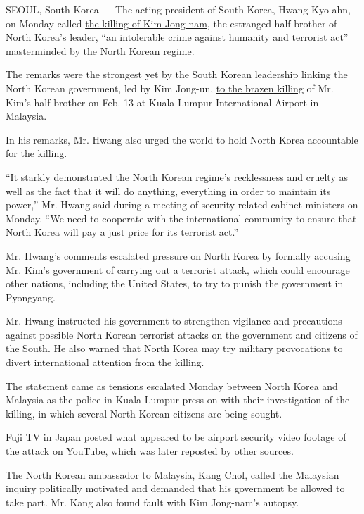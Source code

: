 SEOUL, South Korea --- The acting president of South Korea, Hwang
Kyo-ahn, on Monday called
\href{https://www.nytimes.com/2017/02/15/world/asia/kim-jong-nam-assassination-north-korea.html}{the
killing of Kim Jong-nam}, the estranged half brother of North Korea's
leader, ``an intolerable crime against humanity and terrorist act''
masterminded by the North Korean regime.

The remarks were the strongest yet by the South Korean leadership
linking the North Korean government, led by Kim Jong-un,
\href{https://www.nytimes.com/2017/02/14/world/asia/kim-jong-un-brother-killed-malaysia.html}{to
the brazen killing} of Mr. Kim's half brother on Feb. 13 at Kuala Lumpur
International Airport in Malaysia.

In his remarks, Mr. Hwang also urged the world to hold North Korea
accountable for the killing.

``It starkly demonstrated the North Korean regime's recklessness and
cruelty as well as the fact that it will do anything, everything in
order to maintain its power,'' Mr. Hwang said during a meeting of
security-related cabinet ministers on Monday. ``We need to cooperate
with the international community to ensure that North Korea will pay a
just price for its terrorist act.''

Mr. Hwang's comments escalated pressure on North Korea by formally
accusing Mr. Kim's government of carrying out a terrorist attack, which
could encourage other nations, including the United States, to try to
punish the government in Pyongyang.

Mr. Hwang instructed his government to strengthen vigilance and
precautions against possible North Korean terrorist attacks on the
government and citizens of the South. He also warned that North Korea
may try military provocations to divert international attention from the
killing.

The statement came as tensions escalated Monday between North Korea and
Malaysia as the police in Kuala Lumpur press on with their investigation
of the killing, in which several North Korean citizens are being sought.

Fuji TV in Japan posted what appeared to be airport security video
footage of the attack on YouTube, which was later reposted by other
sources.

The North Korean ambassador to Malaysia, Kang Chol, called the Malaysian
inquiry politically motivated and demanded that his government be
allowed to take part. Mr. Kang also found fault with Kim Jong-nam's
autopsy.

